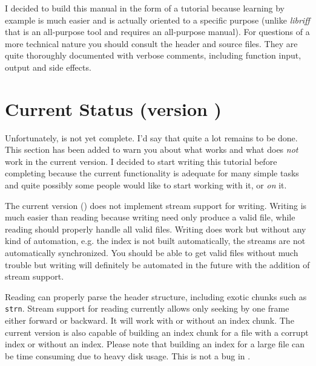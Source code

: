 \documentclass[12pt, a4paper]{article}
\begin{document}
I decided to build this manual in the form of a tutorial because learning by example
is much easier and \libavi{} is actually oriented to a specific purpose (unlike
\emph{libriff} that is an all-purpose tool and requires an all-purpose manual).
For questions of a more technical nature you should consult the header and source files. 
They are quite thoroughly documented with verbose comments, including function
input, output and side effects.


\section{Current Status (version \libversion{})}
Unfortunately, \libavi{} is not yet complete. I'd say that quite a lot remains to be
done. This section has been added to warn you about what works and what does \emph{not}
work in the current version. I decided to start writing this tutorial before 
completing \libavi{} because the current functionality is adequate for many simple
tasks and quite possibly some people would like to start working with it, or \emph{on}
it.

The current version (\libversion{}) does not implement stream support for writing. Writing
is much easier than reading because writing need only produce a valid \AVI{} file, while
reading should properly handle all valid \AVI{} files. Writing does work but 
without any kind of automation, e.g. the index is not built automatically, the streams
are not automatically synchronized. You should be able to get valid \AVI{} files
without much trouble but writing will definitely be automated in the future with the
addition of stream support. 

Reading can properly parse the header structure, including exotic chunks such as
\verb+strn+.
Stream support for reading 
currently allows only seeking by one frame either forward or backward. It will work
with or without an index chunk. The current version is also capable of building
an index chunk for a file with a corrupt index or without an index. Please note that
building an index for a large \AVI{} file can be time consuming due to heavy disk
usage. This is not a bug in \libavi{}.
\end{document}
